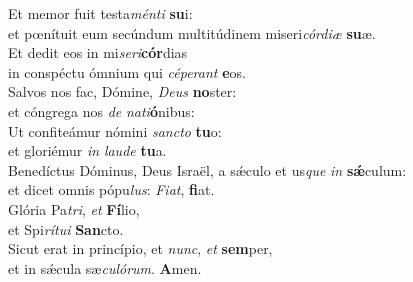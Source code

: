 \oddverse Et memor fuit testa\textit{mén}\textit{ti} \textbf{su}i:~\*\\
\oddverse et pœnítuit eum secúndum multitúdinem miseri\textit{cór}\textit{di}\textit{æ} \textbf{su}æ.\\
\evenverse Et dedit eos in mi\textit{se}\textit{ri}\textbf{cór}dias~\*\\
\evenverse in conspéctu ómnium qui \textit{cé}\textit{pe}\textit{rant} \textbf{e}os.\\
\oddverse Salvos nos fac, Dómine, \textit{De}\textit{us} \textbf{no}ster:~\*\\
\oddverse et cóngrega nos \textit{de} \textit{na}\textit{ti}\textbf{ó}nibus:\\
\evenverse Ut confiteámur nómini \textit{san}\textit{cto} \textbf{tu}o:~\*\\
\evenverse et gloriémur \textit{in} \textit{lau}\textit{de} \textbf{tu}a.\\
\oddverse Benedíctus Dóminus, Deus Israël, a sǽculo et us\textit{que} \textit{in} \textbf{sǽ}culum:~\*\\
\oddverse et dicet omnis pópu\textit{lus}: \textit{Fi}\textit{at}, \textbf{fi}at.\\
\evenverse Glória Pa\textit{tri}, \textit{et} \textbf{Fí}lio,~\*\\
\evenverse et Spi\textit{rí}\textit{tu}\textit{i} \textbf{San}cto.\\
\oddverse Sicut erat in princípio, et \textit{nunc}, \textit{et} \textbf{sem}per,~\*\\
\oddverse et in sǽcula sæ\textit{cu}\textit{ló}\textit{rum}. \textbf{A}men.\\
